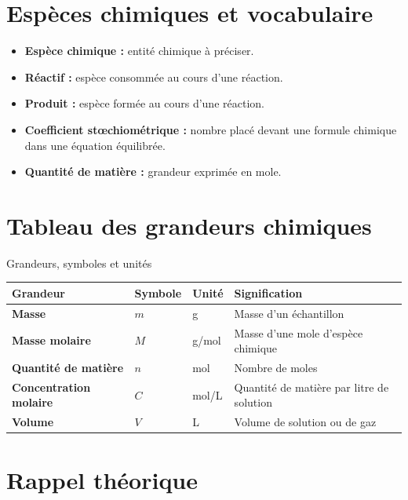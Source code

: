\documentclass[11pt,a4paper]{article}
\begin{document}
\section{Espèces chimiques et vocabulaire}

\begin{cadretheorie}
\begin{itemize}
    \item \textbf{Espèce chimique :} entité chimique à préciser.
    \item \textbf{Réactif :} espèce consommée au cours d’une réaction.
    \item \textbf{Produit :} espèce formée au cours d’une réaction.
    \item \textbf{Coefficient stœchiométrique :} nombre placé devant une formule chimique dans une équation équilibrée.
    \item \textbf{Quantité de matière :} grandeur exprimée en mole.
\end{itemize}
\end{cadretheorie}

\section{Tableau des grandeurs chimiques}

\begin{cadregris}{Grandeurs, symboles et unités}
\renewcommand{\arraystretch}{1.35}
\begin{tabularx}{\textwidth}{>{\bfseries}p{3.2cm}p{2.2cm}p{2.5cm}X}
\toprule
Grandeur & Symbole & Unité & Signification \\
\midrule
Masse & $m$ & g & Masse d’un échantillon \\
Masse molaire & $M$ & g/mol & Masse d’une mole d’espèce chimique \\
Quantité de matière & $n$ & mol & Nombre de moles \\
Concentration molaire & $C$ & mol/L & Quantité de matière par litre de solution \\
Volume & $V$ & L & Volume de solution ou de gaz \\
\bottomrule
\end{tabularx}
\end{cadregris}

\section{Rappel théorique}
\end{document}
